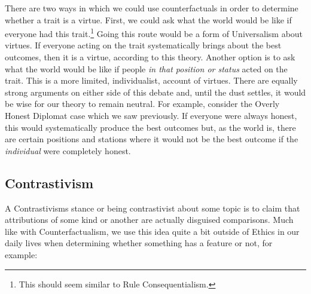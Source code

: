There are two ways in which we could use counterfactuals in order to determine whether a trait is a virtue. First, we could ask what the world would be like if everyone had this trait.\footnote{This should seem similar to Rule Consequentialism.} Going this route would be a form of Universalism about virtues. If everyone acting on the trait systematically brings about the best outcomes, then it is a virtue, according to this theory. Another option is to ask what the world would be like if people \emph{in that position or status} acted on the trait. This is a more limited, individualist, account of virtues. There are equally strong arguments on either side of this debate and, until the dust settles, it would be wise for our theory to remain neutral. For example, consider the Overly Honest Diplomat case which we saw previously. If everyone were always honest, this would systematically produce the best outcomes but, as the world is, there are certain positions and stations where it would not be the best outcome if the \emph{individual} were completely honest. 

\subsection{Contrastivism}

A \glspl{Contrastivism} stance or being contrastivist about some topic is to claim that attributions of some kind or another are actually disguised comparisons. Much like with Counterfactualism, we use this idea quite a bit outside of Ethics in our daily lives when determining whether something has a feature or not, for example:


